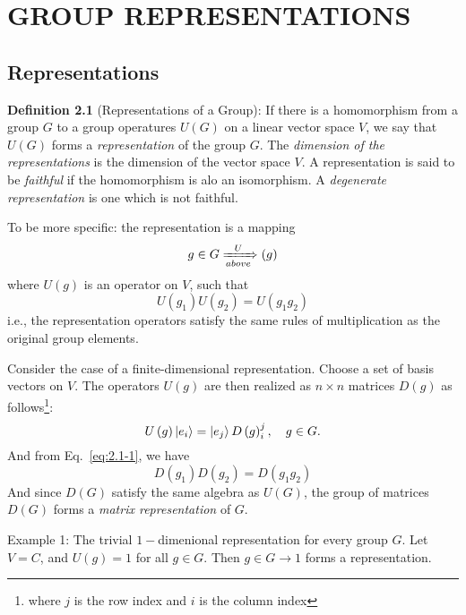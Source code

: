 \chapter{GROUP REPRESENTATIONS}

\section{Representations}
\textbf{Definition 2.1} (Representations of a Group): If there is a homomorphism from a group $G$ to a group operatures $U\left(G\right)$ on a linear vector space $V$, we say that $U\left(G\right)$ forms a \textit{representation} of the group $G$.
The \textit{dimension of the representations} is the dimension of the vector space $V$.
A representation is said to be \textit{faithful} if the homomorphism is alo an isomorphism.
A \textit{degenerate representation} is one which is not faithful.

To be more specific: the representation is a mapping
\begin{equation*}
  g \in G \xRightarrow[above]{U} \left(g\right)
\end{equation*}
where $U\left(g\right)$ is an operator on $V$, such that
\begin{equation}
  \label{eq:2.1-1}
  U\left(g_{1}\right) U\left(g_{2}\right) = U \left(g_{1} g_{2}\right)
\end{equation}
i.e., the representation operators satisfy the same rules of multiplication as the original group elements.

Consider the case of a finite-dimensional representation.
Choose a set of basis vectors on $V$.
The operators $U\left(g\right)$ are then realized as $n\times n$ matrices $D\left(g\right)$ as follows\footnote{where $j$ is the row index and $i$ is the column index}:
\begin{equation}
  \label{eq:2.1-2}
 U\left(g\right) \ket{e_{i}} = \ket{e_{j}} D\left(g\right)^{j}_{i}, ~ ~ ~ g \in G.
\end{equation}
And from Eq.~\eqref{eq:2.1-1}, we have
\begin{equation}
  \label{eq:2.1-3}
 D\left(g_{1}\right) D\left(g_{2}\right) = D\left(g_{1}g_{2}\right)
\end{equation}
And since $D\left(G\right)$ satisfy the same algebra as $U\left(G\right)$, the group of matrices $D\left(G\right)$ forms a \textit{matrix representation} of $G$.

\textrm{Example 1}: The trivial $1-$dimenional representation for every group $G$.
Let $V=C$, and $U\left(g\right) = 1$ for all $g \in G$.
Then $g\in G \longrightarrow 1$ forms a representation.

